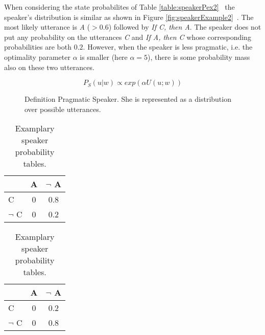 When considering the state probabilites of Table \ref{table:speakerPex2}~ the speaker's distribution is similar as shown in Figure \ref{fig:speakerExample2}~. The most likely utterance is \textit{A} ($>0.6$) followed by \textit{If C, then A}. The speaker does not put any probability on the utterances \textit{C} and \textit{If A, then C} whose corresponding probabilities are both $0.2$. However, when the speaker is less pragmatic, i.e. the optimality parameter $\alpha$ is smaller (here $\alpha =5$), there is some probability mass also on these two utterances.

\begin{figure}
\begin{equation}
P_S (u|w) \propto exp(\alpha U(u;w))
\end{equation}
\caption{Definition Pragmatic Speaker. She is represented as a distribution over possible utterances.}
\label{eq:pragmaticSpeaker}
\end{figure}

\begin{table}[ht]
\centering
\begin{tabular}{|l|c|c|}
\hline 
 & A & $\neg$ A \\ \hline 
C & 0 & 0.8 \\
$\neg$ C & 0 & 0.2\\ \hline
 \end{tabular} \qquad
 \begin{tabular}{|l|c|c|}
\hline 
 & A & $\neg$ A \\ \hline 
C & 0 & 0.2 \\
$\neg$ C & 0 & 0.8\\ \hline
 \end{tabular}

  \qquad
{}
\caption{Examplary speaker probability tables.}
 \label{table:PspeakerNotA}
\end{table}



